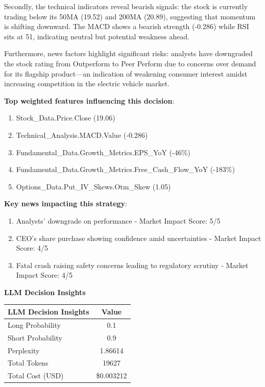 \documentclass[8pt]{scrartcl}
\begin{document}
Secondly, the technical indicators reveal bearish signals: the stock is currently trading below its 50MA (19.52) and 200MA (20.89), suggesting that momentum is shifting downward. The MACD shows a bearish strength (-0.286) while RSI sits at 51, indicating neutral but potential weakness ahead.

Furthermore, news factors highlight significant risks: analysts have downgraded the stock rating from Outperform to Peer Perform due to concerns over demand for its flagship product—an indication of weakening consumer interest amidst increasing competition in the electric vehicle market.

\textbf{Top weighted features influencing this decision}:
\begin{enumerate}
    \item Stock\_Data.Price.Close (19.06)
    \item Technical\_Analysis.MACD.Value (-0.286)
    \item Fundamental\_Data.Growth\_Metrics.EPS\_YoY (-46\%)
    \item Fundamental\_Data.Growth\_Metrics.Free\_Cash\_Flow\_YoY (-183\%)
    \item Options\_Data.Put\_IV\_Skews.Otm\_Skew (1.05)
\end{enumerate}

\textbf{Key news impacting this strategy}:
\begin{enumerate}
    \item Analysts’ downgrade on performance - Market Impact Score: 5/5
    \item CEO’s share purchase showing confidence amid uncertainties - Market Impact Score: 4/5
    \item Fatal crash raising safety concerns leading to regulatory scrutiny - Market Impact Score: 4/5
\end{enumerate}

\textbf{LLM Decision Insights}

\begin{longtable}{l c}
\toprule
\textbf{LLM Decision Insights} & \textbf{Value} \\
\midrule
Long Probability & 0.1 \\
Short Probability & 0.9 \\
Perplexity & 1.86614   \\
\midrule
Total Tokens & 19627 \\
Total Cost (USD) & \$0.003212 \\
\bottomrule
\end{longtable}
\end{document}
